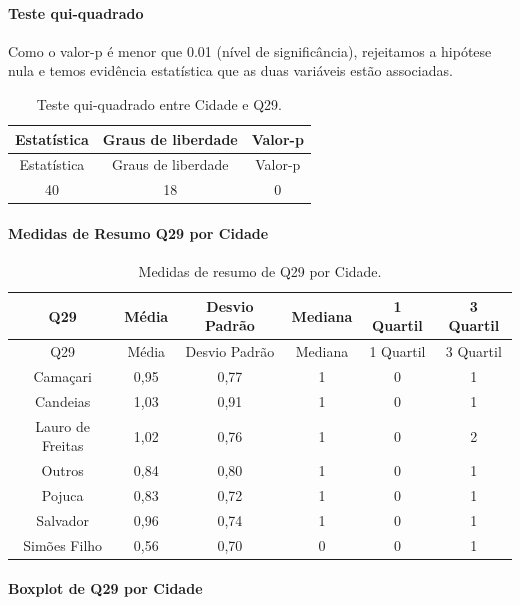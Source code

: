 \documentclass[]{article}
\let\oldparagraph\paragraph
\renewcommand{\paragraph}[1]{\oldparagraph{#1}\mbox{}}
\begin{document}
\hypertarget{teste-qui-quadrado-77}{%
\paragraph{Teste qui-quadrado}\label{teste-qui-quadrado-77}}

Como o valor-p é menor que 0.01 (nível de significância), rejeitamos a hipótese nula e temos evidência estatística que as duas variáveis estão associadas.

\begin{longtable}[]{@{}ccc@{}}
\caption{\label{tab:unnamed-chunk-901}Teste qui-quadrado entre Cidade e Q29.}\tabularnewline
\toprule
Estatística & Graus de liberdade & Valor-p\tabularnewline
\midrule
\endfirsthead
\toprule
Estatística & Graus de liberdade & Valor-p\tabularnewline
\midrule
\endhead
40 & 18 & 0\tabularnewline
\bottomrule
\end{longtable}

\cleardoublepage

\hypertarget{medidas-de-resumo-q29-por-cidade}{%
\paragraph{Medidas de Resumo Q29 por Cidade}\label{medidas-de-resumo-q29-por-cidade}}

\begin{longtable}[]{@{}cccccc@{}}
\caption{\label{tab:unnamed-chunk-902}Medidas de resumo de Q29 por Cidade.}\tabularnewline
\toprule
Q29 & Média & Desvio Padrão & Mediana & 1 Quartil & 3 Quartil\tabularnewline
\midrule
\endfirsthead
\toprule
Q29 & Média & Desvio Padrão & Mediana & 1 Quartil & 3 Quartil\tabularnewline
\midrule
\endhead
Camaçari & 0,95 & 0,77 & 1 & 0 & 1\tabularnewline
Candeias & 1,03 & 0,91 & 1 & 0 & 1\tabularnewline
Lauro de Freitas & 1,02 & 0,76 & 1 & 0 & 2\tabularnewline
Outros & 0,84 & 0,80 & 1 & 0 & 1\tabularnewline
Pojuca & 0,83 & 0,72 & 1 & 0 & 1\tabularnewline
Salvador & 0,96 & 0,74 & 1 & 0 & 1\tabularnewline
Simões Filho & 0,56 & 0,70 & 0 & 0 & 1\tabularnewline
\bottomrule
\end{longtable}

\hypertarget{boxplot-de-q29-por-cidade}{%
\paragraph{Boxplot de Q29 por Cidade}\label{boxplot-de-q29-por-cidade}}
\end{document}
